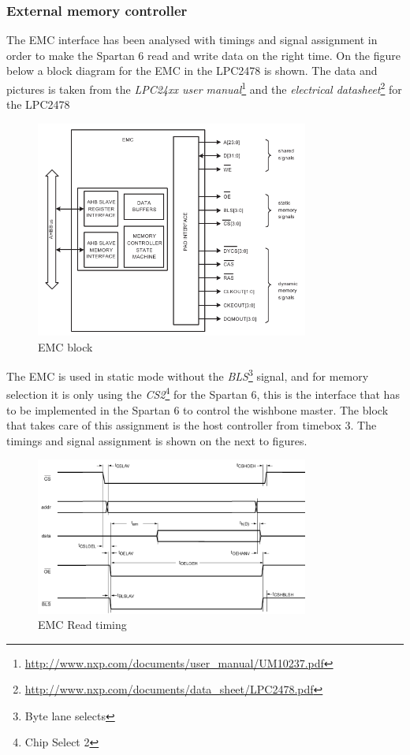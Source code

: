 \subsubsection{External memory controller}
The EMC interface has been analysed with timings and signal assignment in order to make the Spartan 6 read and write data on the right time. On the figure below a block diagram for the EMC in the LPC2478 is shown. The data and pictures is taken from the \textit{LPC24xx user manual}\footnote{\url{http://www.nxp.com/documents/user\_manual/UM10237.pdf}} and the \textit{electrical datasheet}\footnote{\url{http://www.nxp.com/documents/data\_sheet/LPC2478.pdf}} for the LPC2478
\begin{figure}[H]
	\begin{centering}
		\includegraphics[width=0.8\textwidth]{images/tb7_EMC_block.png}
		\caption{EMC block}
	\end{centering}
\end{figure}
The EMC is used in static mode without the \textit{BLS}\footnote{Byte lane selects} signal, and for memory selection it is only using the \textit{CS2}\footnote{Chip Select 2} for the Spartan 6, this is the interface that has to be implemented in the Spartan 6 to control the wishbone master. The block that takes care of this assignment is the host controller from timebox 3. The timings and signal assignment is shown on the next to figures.
\begin{figure}[H]
	\begin{centering}
		\includegraphics[width=0.8\textwidth]{images/tb7_EMC_read.png}
		\caption{EMC Read timing}
	\end{centering}
\end{figure}
